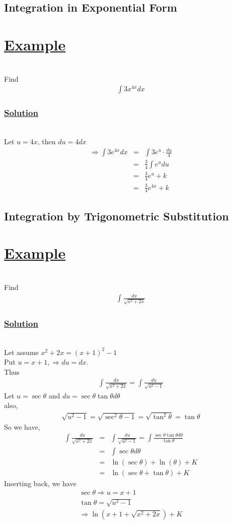 \documentclass[12pt]{report}
\newcommand{\ubt}[1]{\textbf{\underline{#1}}}
\newcommand{\sps}{\\[0.2cm]}
\newcommand{\spn}[1]{\\[#1cm]}
\newcommand{\solution}{\subsubsection{\ubt{Solution}}{~}\spn{-1}}
\newcommand{\eg}{\section*{\ubt{Example}}{~}\spn{-1}}
\begin{document}
	
	\subsection{Integration in Exponential Form}
	\eg
	Find
	\begin{eqnarray*}
		\int 3x^{4x}dx
	\end{eqnarray*}
	\solution
	Let $u = 4x$, then $du = 4dx$
	\begin{eqnarray*}
		\Rightarrow \int 3e^{4x}dx &=& \int 3e^{u} \cdot \frac{du}{4}\sps
		&=& \frac{3}{4}\int e^u du\sps
		&=& \frac{3}{4}e^u + k\sps
		&=& \frac{3}{4}e^{4x} + k
	\end{eqnarray*}
	
	\subsection{Integration by Trigonometric Substitution}
	\eg
	Find
	\begin{eqnarray*}
		\int\frac{dx}{\sqrt{x^2 + 2x}}
	\end{eqnarray*}
	\solution
	Let assume $x^2 + 2x = (x+1)^2 - 1$\\
	Put $u = x+1, \Rightarrow du = dx$.\\
	Thus
	\begin{eqnarray*}
		\int\frac{dx}{\sqrt{x^2 + 2x}} = \int \frac{du}{\sqrt{u^2 - 1}}
	\end{eqnarray*}	
	Let $u = \sec\theta$ and $du = \sec\theta\tan\theta d \theta$\\
	also,
	\begin{eqnarray*}
		\sqrt{u^2 - 1} = \sqrt{\sec^2\theta - 1} = \sqrt{\tan^2\theta} = \tan\theta
	\end{eqnarray*}
	So we have,
	\begin{eqnarray*}
			\int\frac{dx}{\sqrt{x^2 + 2x}} &=& \int\frac{du}{\sqrt{u^2 - 1}} = \int\frac{\sec\theta\tan\theta d\theta}{\tan \theta}\sps
			&=& \int \sec\theta d\theta\sps
			&=& \ln(\sec\theta) + \ln(\theta) + K\sps
			&=& \ln(\sec\theta + \tan\theta) + K
	\end{eqnarray*}
	Inserting back, we have
	\begin{gather*}
		\sec\theta \Rightarrow u = x + 1\sps
		\tan\theta = \sqrt{u^2 - 1}\sps
		\Rightarrow \ln(x+1 + \sqrt{x^2 + 2x}) + K
	\end{gather*}
	
\end{document}
